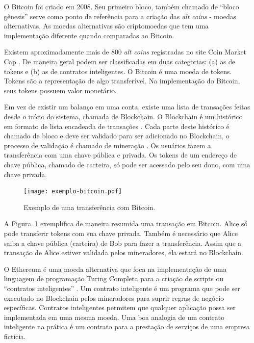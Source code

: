 \documentclass[
article,			%
12pt,				%
openright,			%
oneside,			%
a4paper,			%
chapter=TITLE,		%
section=TITLE,		%
subsection=TITLE,	%
subsubsection=TITLE,%
subsubsubsection=TITLE, %
english,			%
brazil,				%
]{abntex2}
\begin{document}
O Bitcoin foi criado em 2008. Seu primeiro bloco, também chamado de
``bloco gênesis'' serve como ponto de referência para a criação das
\emph{alt coins} - moedas alternativas. As moedas alternativas são
criptomoedas que tem uma implementação diferente quando comparadas ao
Bitcoin. 

Existem aproximadamente mais de 800 \emph{alt coins} registradas no
site Coin Market Cap \cite{Arsov, CoinMarketCap2018}.  De maneira
geral podem ser classificadas em duas categorias: (a) as de tokens e
(b) as de contratos inteligentes.  O Bitcoin é uma moeda de tokens.
Tokens são a representação de algo transferível. Na implementação do
Bitcoin, seus tokens possuem valor monetário.  

Em vez de existir um balanço em uma conta, existe uma lista de
transações feitas desde o início do sistema, chamada de Blockchain. O
Blockchain é um histórico em formato de lista encadeada de transações
\cite{Weber2012}. Cada parte deste histórico é chamado de bloco e deve
ser validado para ser adicionado no Blockchain, o processo de
validação é chamado de mineração \cite{LChicarino}. Os usuários fazem
a transferência com uma chave pública e privada. Os tokens de um
endereço de chave pública, chamado de carteira, só pode ser acessado
pelo seu dono, com uma chave privada.

\begin{figure}[H]
    \caption{\label{fig:exemplo-bitcoin}Exemplo de uma transferência
        com Bitcoin.}
    \begin{center}
        \texttt{[image: exemplo-bitcoin.pdf]}
    \end{center}
\end{figure}

A Figura~\ref{fig:exemplo-bitcoin} exemplifica de maneira resumida uma
transação em Bitcoin. Alice só pode transferir tokens com sua chave
privada. Também é necessário que Alice saiba a chave pública
(carteira) de Bob para fazer a transferência. Assim que a transação de
Alice estiver validada pelos mineradores, ela estará no Blockchain.


O Ethereum é uma moeda alternativa que foca na implementação de uma
linguagem de programação Turing Completa para a criação de scripts ou
``contratos inteligentes'' \cite{Narayanan2016}. Um contrato
inteligente é um programa que pode ser executado no Blockchain pelos
mineradores para suprir regras de negócio específicas. Contratos
inteligentes permitem que qualquer aplicação possa ser implementada em
uma mesma moeda. Uma boa analogia de um contrato inteligente na
prática é um contrato para a prestação de serviços de uma empresa
fictícia.
\end{document}
